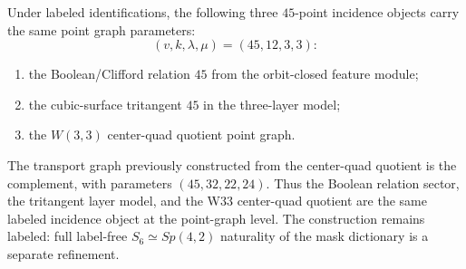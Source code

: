 \makeatletter
{}
\makeatother

\begin{theorem}
\label{thm:triple-fortyfive-incidence-bridge}
Under labeled identifications, the following three $45$-point incidence objects
carry the same point graph parameters:
\[
  (v,k,\lambda,\mu)=(45,12,3,3):
\]
\begin{enumerate}
\item the Boolean/Clifford relation $45$ from the orbit-closed feature module;
\item the cubic-surface tritangent $45$ in the three-layer model;
\item the $W(3,3)$ center-quad quotient point graph.
\end{enumerate}
The transport graph previously constructed from the center-quad quotient is the
complement, with parameters $(45,32,22,24)$.  Thus the Boolean relation sector,
the tritangent layer model, and the W33 center-quad quotient are the same labeled
incidence object at the point-graph level.  The construction remains labeled:
full label-free $S_6\simeq Sp(4,2)$ naturality of the mask dictionary is a
separate refinement.
\end{theorem}
